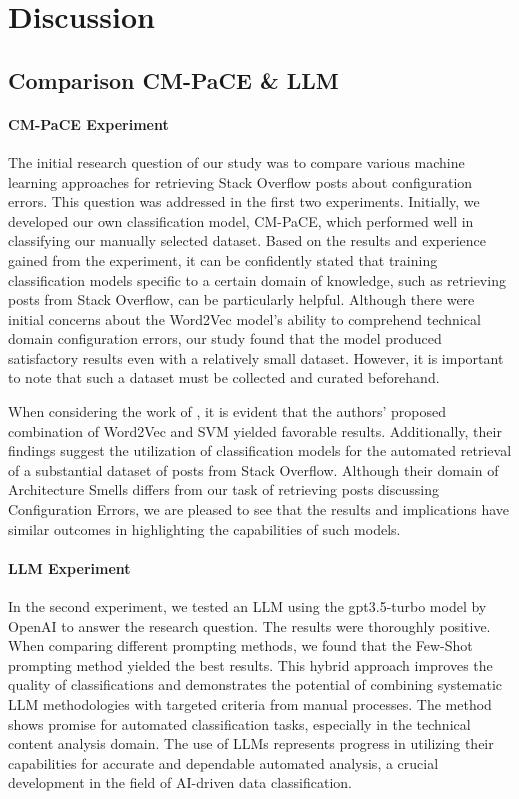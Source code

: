 \documentclass[english,bachelor]{swsLeipzig}
\begin{document}
\chapter{Discussion}

\section{Comparison CM-PaCE \& LLM}

\subsubsection{CM-PaCE Experiment}

The initial research question of our study was to compare various machine learning approaches for 
retrieving Stack Overflow posts about configuration errors. This question was addressed in the first two experiments. Initially, we developed our own classification model, CM-PaCE, which performed well in classifying our manually selected dataset. Based on the results and experience gained from the experiment, it can be confidently stated that training classification models specific to a certain domain of knowledge, such as retrieving posts from Stack Overflow, can be particularly helpful. Although there were initial concerns about the Word2Vec model's ability to comprehend technical domain configuration errors, our study found that the model produced satisfactory results even with a relatively small dataset. However, it is important to note that such a dataset must be collected and curated beforehand.

When considering the work of \citet{tian:2020}, it is evident that the authors' proposed 
combination of Word2Vec and SVM yielded favorable results. Additionally, their findings suggest the utilization of classification models for the automated retrieval of a substantial dataset of posts from Stack Overflow. Although their domain of Architecture Smells differs from our task of retrieving posts discussing Configuration Errors, we are pleased to see that the results and implications have similar outcomes in highlighting the capabilities of such models.

\subsubsection{LLM Experiment}

In the second experiment, we tested an LLM using the gpt3.5-turbo model by OpenAI to answer the 
research question. The results were thoroughly positive. When comparing different prompting methods, we found that the Few-Shot prompting method yielded the best results. This hybrid approach improves the quality of classifications and demonstrates the potential of combining systematic LLM methodologies with targeted criteria from manual processes. The method shows promise for automated classification tasks, especially in the technical content analysis domain. The use of LLMs represents progress in utilizing their capabilities for accurate and dependable automated analysis, a crucial development in the field of AI-driven data classification.
\end{document}
